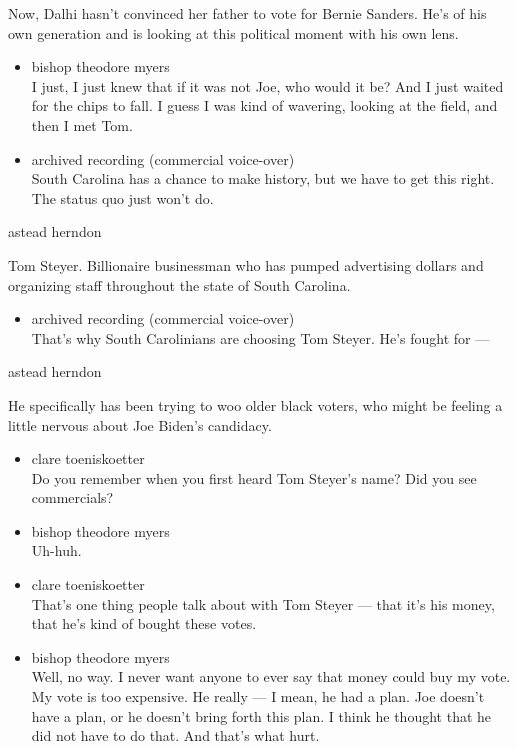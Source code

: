Now, Dalhi hasn't convinced her father to vote for Bernie Sanders. He's
of his own generation and is looking at this political moment with his
own lens.

\begin{itemize}
\item
  bishop theodore myers\\
  I just, I just knew that if it was not Joe, who would it be? And I
  just waited for the chips to fall. I guess I was kind of wavering,
  looking at the field, and then I met Tom.
\item
  archived recording (commercial voice-over)\\
  South Carolina has a chance to make history, but we have to get this
  right. The status quo just won't do.
\end{itemize}

astead herndon

Tom Steyer. Billionaire businessman who has pumped advertising dollars
and organizing staff throughout the state of South Carolina.

\begin{itemize}
\tightlist
\item
  archived recording (commercial voice-over)\\
  That's why South Carolinians are choosing Tom Steyer. He's fought for
  ---
\end{itemize}

astead herndon

He specifically has been trying to woo older black voters, who might be
feeling a little nervous about Joe Biden's candidacy.

\begin{itemize}
\item
  clare toeniskoetter\\
  Do you remember when you first heard Tom Steyer's name? Did you see
  commercials?
\item
  bishop theodore myers\\
  Uh-huh.
\item
  clare toeniskoetter\\
  That's one thing people talk about with Tom Steyer --- that it's his
  money, that he's kind of bought these votes.
\item
  bishop theodore myers\\
  Well, no way. I never want anyone to ever say that money could buy my
  vote. My vote is too expensive. He really --- I mean, he had a plan.
  Joe doesn't have a plan, or he doesn't bring forth this plan. I think
  he thought that he did not have to do that. And that's what hurt.
\end{itemize}

